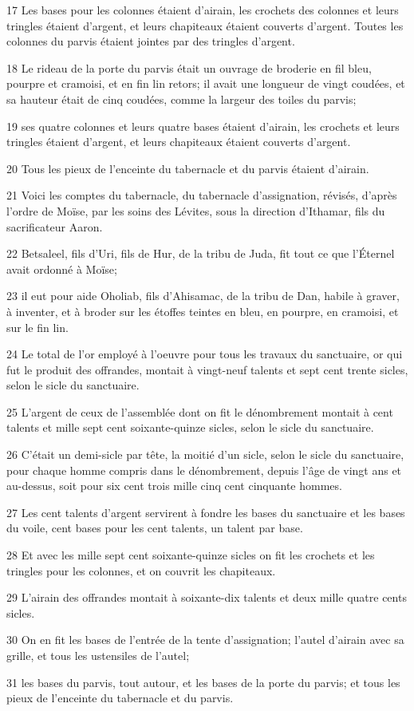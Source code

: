 \par 17 Les bases pour les colonnes étaient d'airain, les crochets des colonnes et leurs tringles étaient d'argent, et leurs chapiteaux étaient couverts d'argent. Toutes les colonnes du parvis étaient jointes par des tringles d'argent.
\par 18 Le rideau de la porte du parvis était un ouvrage de broderie en fil bleu, pourpre et cramoisi, et en fin lin retors; il avait une longueur de vingt coudées, et sa hauteur était de cinq coudées, comme la largeur des toiles du parvis;
\par 19 ses quatre colonnes et leurs quatre bases étaient d'airain, les crochets et leurs tringles étaient d'argent, et leurs chapiteaux étaient couverts d'argent.
\par 20 Tous les pieux de l'enceinte du tabernacle et du parvis étaient d'airain.
\par 21 Voici les comptes du tabernacle, du tabernacle d'assignation, révisés, d'après l'ordre de Moïse, par les soins des Lévites, sous la direction d'Ithamar, fils du sacrificateur Aaron.
\par 22 Betsaleel, fils d'Uri, fils de Hur, de la tribu de Juda, fit tout ce que l'Éternel avait ordonné à Moïse;
\par 23 il eut pour aide Oholiab, fils d'Ahisamac, de la tribu de Dan, habile à graver, à inventer, et à broder sur les étoffes teintes en bleu, en pourpre, en cramoisi, et sur le fin lin.
\par 24 Le total de l'or employé à l'oeuvre pour tous les travaux du sanctuaire, or qui fut le produit des offrandes, montait à vingt-neuf talents et sept cent trente sicles, selon le sicle du sanctuaire.
\par 25 L'argent de ceux de l'assemblée dont on fit le dénombrement montait à cent talents et mille sept cent soixante-quinze sicles, selon le sicle du sanctuaire.
\par 26 C'était un demi-sicle par tête, la moitié d'un sicle, selon le sicle du sanctuaire, pour chaque homme compris dans le dénombrement, depuis l'âge de vingt ans et au-dessus, soit pour six cent trois mille cinq cent cinquante hommes.
\par 27 Les cent talents d'argent servirent à fondre les bases du sanctuaire et les bases du voile, cent bases pour les cent talents, un talent par base.
\par 28 Et avec les mille sept cent soixante-quinze sicles on fit les crochets et les tringles pour les colonnes, et on couvrit les chapiteaux.
\par 29 L'airain des offrandes montait à soixante-dix talents et deux mille quatre cents sicles.
\par 30 On en fit les bases de l'entrée de la tente d'assignation; l'autel d'airain avec sa grille, et tous les ustensiles de l'autel;
\par 31 les bases du parvis, tout autour, et les bases de la porte du parvis; et tous les pieux de l'enceinte du tabernacle et du parvis.


